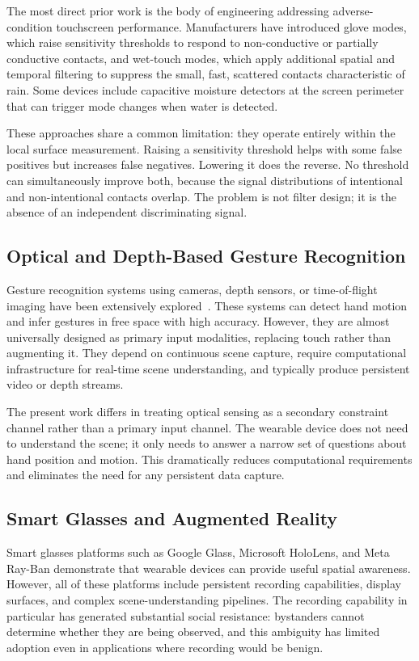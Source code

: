 \documentclass[11pt,letterpaper]{article}
\begin{document}
The most direct prior work is the body of engineering addressing adverse-condition
touchscreen performance. Manufacturers have introduced glove modes, which raise
sensitivity thresholds to respond to non-conductive or partially conductive contacts,
and wet-touch modes, which apply additional spatial and temporal filtering to suppress
the small, fast, scattered contacts characteristic of rain. Some devices include
capacitive moisture detectors at the screen perimeter that can trigger mode changes
when water is detected.

These approaches share a common limitation: they operate entirely within the local
surface measurement. Raising a sensitivity threshold helps with some false positives
but increases false negatives. Lowering it does the reverse. No threshold can
simultaneously improve both, because the signal distributions of intentional and
non-intentional contacts overlap. The problem is not filter design; it is the
absence of an independent discriminating signal.

\subsection{Optical and Depth-Based Gesture Recognition}

Gesture recognition systems using cameras, depth sensors, or time-of-flight
imaging have been extensively explored~\cite{gesture_survey}. These systems can
detect hand motion and infer gestures in free space with high accuracy. However,
they are almost universally designed as primary input modalities, replacing touch
rather than augmenting it. They depend on continuous scene capture, require
computational infrastructure for real-time scene understanding, and typically
produce persistent video or depth streams.

The present work differs in treating optical sensing as a secondary constraint
channel rather than a primary input channel. The wearable device does not need to
understand the scene; it only needs to answer a narrow set of questions about hand
position and motion. This dramatically reduces computational requirements and
eliminates the need for any persistent data capture.

\subsection{Smart Glasses and Augmented Reality}

Smart glasses platforms such as Google Glass, Microsoft HoloLens, and Meta Ray-Ban
demonstrate that wearable devices can provide useful spatial awareness. However, all
of these platforms include persistent recording capabilities, display surfaces, and
complex scene-understanding pipelines. The recording capability in particular has
generated substantial social resistance: bystanders cannot determine whether they
are being observed, and this ambiguity has limited adoption even in applications
where recording would be benign.
\end{document}
